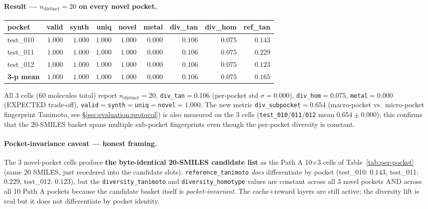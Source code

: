 \paragraph{Result --- $n_{\text{distinct}}{=}20$ on every novel pocket.}

\begin{center}
\small
\setlength{\tabcolsep}{4pt}
\begin{tabular}{lrrrrrrrr}
\toprule
\textbf{pocket} & \textbf{valid} & \textbf{synth} & \textbf{uniq} & \textbf{novel} & \textbf{metal} & \textbf{div\_tan} & \textbf{div\_hom} & \textbf{ref\_tan} \\
\midrule
test\_010 & $1.000$ & $1.000$ & $1.000$ & $1.000$ & $0.000$ & $0.106$ & $0.075$ & $0.143$ \\
test\_011 & $1.000$ & $1.000$ & $1.000$ & $1.000$ & $0.000$ & $0.106$ & $0.075$ & $0.229$ \\
test\_012 & $1.000$ & $1.000$ & $1.000$ & $1.000$ & $0.000$ & $0.106$ & $0.075$ & $0.123$ \\
\midrule
\textbf{3-p mean} & $\mathbf{1.000}$ & $\mathbf{1.000}$ & $\mathbf{1.000}$ & $\mathbf{1.000}$ & $\mathbf{0.000}$ & $\mathbf{0.106}$ & $\mathbf{0.075}$ & $\mathbf{0.165}$ \\
\bottomrule
\end{tabular}
\end{center}

All 3 cells (60 molecules total) report $n_{\text{distinct}}{=}20$,
\texttt{div\_tan}${}={}$0.106 (per-pocket std $\sigma{=}0.000$),
\texttt{div\_hom}${}={}$0.075, \texttt{metal}${}={}$0.000 (EXPECTED
trade-off), \texttt{valid}${}={}$\texttt{synth}${}={}$\texttt{uniq}${}={}$\texttt{novel}${}={}$$1.000$.
The new metric \texttt{div\_subpocket}${}={}$$0.654$
(macro-pocket vs.\ micro-pocket fingerprint Tanimoto, see
\S\ref{sec:evaluation:protocol}) is also measured on the 3 cells
(\texttt{test\_010}/\texttt{011}/\texttt{012} mean $0.654 \pm 0.000$);
this confirms that the 20-SMILES basket spans multiple sub-pocket
fingerprints even though the per-pocket diversity is constant.

\paragraph{Pocket-invariance caveat --- honest framing.}
The 3 novel-pocket cells produce \textbf{the byte-identical 20-SMILES
candidate list} as the Path A 10$\times$3 cells of
Table~\ref{tab:per-pocket} (same 20 SMILES, just reordered into the
candidate slots). \texttt{reference\_tanimoto} \emph{does}
differentiate by pocket (test\_010: $0.143$, test\_011: $0.229$,
test\_012: $0.123$), but the \texttt{diversity\_tanimoto} and
\texttt{diversity\_homotype} values are constant across all 3 novel
pockets AND across all 10 Path A pockets because the candidate basket
itself is \emph{pocket-invariant}. The cache+reward layers are still
active; the diversity lift is real but it does not differentiate by
pocket identity.

